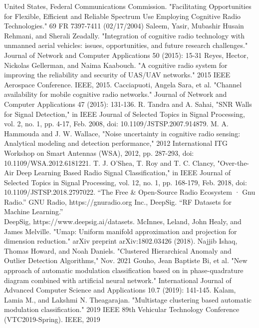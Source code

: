 \documentclass[conference]{IEEEtran}
\begin{document}
\begin{thebibliography}{00}
United States, Federal Communications Commission. "Facilitating Opportunities for Flexible, Efficient and Reliable Spectrum Use Employing Cognitive Radio Technologies." 69 FR 7397-7411 (02/17/2004)
Saleem, Yasir, Mubashir Husain Rehmani, and Sherali Zeadally. "Integration of cognitive radio technology with unmanned aerial vehicles: issues, opportunities, and future research challenges." Journal of Network and Computer Applications 50 (2015): 15-31
Reyes, Hector, Nickolas Gellerman, and Naima Kaabouch. "A cognitive radio system for improving the reliability and security of UAS/UAV networks." 2015 IEEE Aerospace Conference. IEEE, 2015.
Cacciapuoti, Angela Sara, et al. "Channel availability for mobile cognitive radio networks." Journal of Network and Computer Applications 47 (2015): 131-136.
R. Tandra and A. Sahai, "SNR Walls for Signal Detection," in IEEE Journal of Selected Topics in Signal Processing, vol. 2, no. 1, pp. 4-17, Feb. 2008, doi: 10.1109/JSTSP.2007.914879.
M. A. Hammouda and J. W. Wallace, "Noise uncertainty in cognitive radio sensing: Analytical modeling and detection performance," 2012 International ITG Workshop on Smart Antennas (WSA), 2012, pp. 287-293, doi: 10.1109/WSA.2012.6181221.
T. J. O’Shea, T. Roy and T. C. Clancy, "Over-the-Air Deep Learning Based Radio Signal Classification," in IEEE Journal of Selected Topics in Signal Processing, vol. 12, no. 1, pp. 168-179, Feb. 2018, doi: 10.1109/JSTSP.2018.2797022.
“The Free \& Open-Source Radio Ecosystem · Gnu Radio.” GNU Radio, https://gnuradio.org
Inc., DeepSig. “RF Datasets for Machine Learning.” \\DeepSig, https://www.deepsig.ai/datasets.
McInnes, Leland, John Healy, and James Melville. "Umap: Uniform manifold approximation and projection for dimension reduction." arXiv preprint arXiv:1802.03426 (2018).
Najjib Ishaq, Thomas Howard, and Noah Daniels. "Clustered Hierarchical Anomaly and Outlier Detection Algorithms," Nov. 2021
Gouho, Jean Baptiste Bi, et al. "New approach of automatic modulation classification based on in phase-quadrature diagram combined with artificial neural network." International Journal of Advanced Computer Science and Applications 10.7 (2019): 141-145.
Kalam, Lamia M., and Lakshmi N. Theagarajan. "Multistage clustering based automatic modulation classification." 2019 IEEE 89th Vehicular Technology Conference (VTC2019-Spring). IEEE, 2019
\end{thebibliography}
\vspace{12pt}
\end{document}
